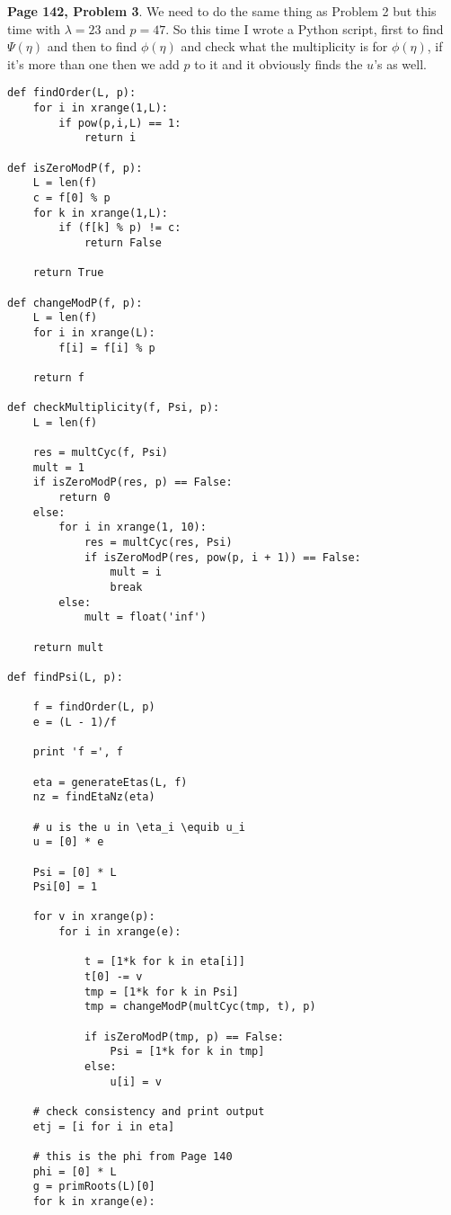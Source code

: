 \documentclass[aps,preprint,preprintnumbers,nofootinbib,showpacs,prd]{revtex4-1}
\begin{document}
{\bf Page 142, Problem 3}. We need to do the same thing as Problem 2 but this time with $\lambda = 23$ and $p = 47$. So this time I wrote a Python script, first to find $\Psi(\eta)$ and then to find $\phi(\eta)$ and check what the multiplicity is for $\phi(\eta)$, if it's more than one then we add $p$ to it and it obviously finds the $u$'s as well.
%
\begin{Verbatim}[baselinestretch=0.75]
def findOrder(L, p):
    for i in xrange(1,L):
        if pow(p,i,L) == 1:
            return i

def isZeroModP(f, p):
    L = len(f)
    c = f[0] % p
    for k in xrange(1,L):
        if (f[k] % p) != c:
            return False

    return True

def changeModP(f, p):
    L = len(f)
    for i in xrange(L):
        f[i] = f[i] % p

    return f

def checkMultiplicity(f, Psi, p):
    L = len(f)
    
    res = multCyc(f, Psi)
    mult = 1
    if isZeroModP(res, p) == False:
        return 0
    else:
        for i in xrange(1, 10):
            res = multCyc(res, Psi)
            if isZeroModP(res, pow(p, i + 1)) == False:
                mult = i
                break
        else:
            mult = float('inf')

    return mult

def findPsi(L, p):

    f = findOrder(L, p)
    e = (L - 1)/f

    print 'f =', f
    
    eta = generateEtas(L, f)
    nz = findEtaNz(eta)

    # u is the u in \eta_i \equib u_i
    u = [0] * e

    Psi = [0] * L
    Psi[0] = 1
    
    for v in xrange(p):
        for i in xrange(e):

            t = [1*k for k in eta[i]]
            t[0] -= v
            tmp = [1*k for k in Psi]
            tmp = changeModP(multCyc(tmp, t), p)

            if isZeroModP(tmp, p) == False:
                Psi = [1*k for k in tmp]
            else:
                u[i] = v

    # check consistency and print output
    etj = [i for i in eta]

    # this is the phi from Page 140
    phi = [0] * L    
    g = primRoots(L)[0]
    for k in xrange(e):


\end{Verbatim}
\end{document}
